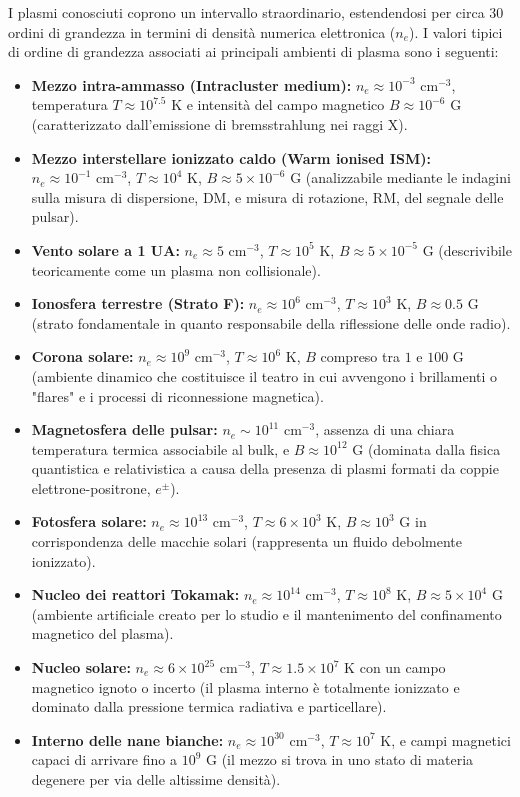 I plasmi conosciuti coprono un intervallo straordinario, estendendosi per circa $30$ ordini di grandezza in termini di densità numerica elettronica ($n_e$). I valori tipici di ordine di grandezza associati ai principali ambienti di plasma sono i seguenti:
\begin{itemize}
\item \textbf{Mezzo intra-ammasso (Intracluster medium):} $n_e \approx 10^{-3} \text{ cm}^{-3}$, temperatura $T \approx 10^{7.5} \text{ K}$ e intensità del campo magnetico $B \approx 10^{-6} \text{ G}$ (caratterizzato dall'emissione di bremsstrahlung nei raggi X).
\item \textbf{Mezzo interstellare ionizzato caldo (Warm ionised ISM):} $n_e \approx 10^{-1} \text{ cm}^{-3}$, $T \approx 10^4 \text{ K}$, $B \approx 5 \times 10^{-6} \text{ G}$ (analizzabile mediante le indagini sulla misura di dispersione, DM, e misura di rotazione, RM, del segnale delle pulsar).
\item \textbf{Vento solare a 1 UA:} $n_e \approx 5 \text{ cm}^{-3}$, $T \approx 10^5 \text{ K}$, $B \approx 5 \times 10^{-5} \text{ G}$ (descrivibile teoricamente come un plasma non collisionale).
\item \textbf{Ionosfera terrestre (Strato F):} $n_e \approx 10^6 \text{ cm}^{-3}$, $T \approx 10^3 \text{ K}$, $B \approx 0.5 \text{ G}$ (strato fondamentale in quanto responsabile della riflessione delle onde radio).
\item \textbf{Corona solare:} $n_e \approx 10^9 \text{ cm}^{-3}$, $T \approx 10^6 \text{ K}$, $B$ compreso tra $1$ e $100 \text{ G}$ (ambiente dinamico che costituisce il teatro in cui avvengono i brillamenti o "flares" e i processi di riconnessione magnetica).
\item \textbf{Magnetosfera delle pulsar:} $n_e \sim 10^{11} \text{ cm}^{-3}$, assenza di una chiara temperatura termica associabile al bulk, e $B \approx 10^{12} \text{ G}$ (dominata dalla fisica quantistica e relativistica a causa della presenza di plasmi formati da coppie elettrone-positrone, $e^{\pm}$).
\item \textbf{Fotosfera solare:} $n_e \approx 10^{13} \text{ cm}^{-3}$, $T \approx 6 \times 10^3 \text{ K}$, $B \approx 10^3 \text{ G}$ in corrispondenza delle macchie solari (rappresenta un fluido debolmente ionizzato).
\item \textbf{Nucleo dei reattori Tokamak:} $n_e \approx 10^{14} \text{ cm}^{-3}$, $T \approx 10^8 \text{ K}$, $B \approx 5 \times 10^4 \text{ G}$ (ambiente artificiale creato per lo studio e il mantenimento del confinamento magnetico del plasma).
\item \textbf{Nucleo solare:} $n_e \approx 6 \times 10^{25} \text{ cm}^{-3}$, $T \approx 1.5 \times 10^7 \text{ K}$ con un campo magnetico ignoto o incerto (il plasma interno è totalmente ionizzato e dominato dalla pressione termica radiativa e particellare).
\item \textbf{Interno delle nane bianche:} $n_e \approx 10^{30} \text{ cm}^{-3}$, $T \approx 10^7 \text{ K}$, e campi magnetici capaci di arrivare fino a $10^9 \text{ G}$ (il mezzo si trova in uno stato di materia degenere per via delle altissime densità).
\end{itemize}

